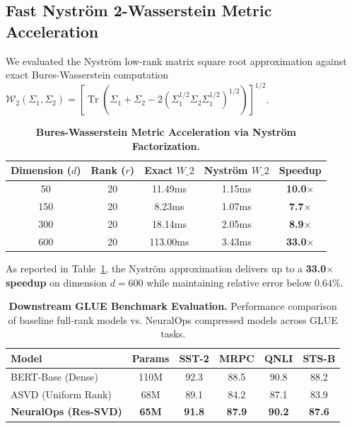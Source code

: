 \subsection{Fast Nystr\"om 2-Wasserstein Metric Acceleration}
We evaluated the Nystr\"om low-rank matrix square root approximation against exact Bures-Wasserstein computation $\mathcal{W}_2(\Sigma_1, \Sigma_2) = \left[\operatorname{Tr}(\Sigma_1 + \Sigma_2 - 2(\Sigma_1^{1/2} \Sigma_2 \Sigma_1^{1/2})^{1/2})\right]^{1/2}$.

\begin{table}[h]
\centering
\small
\caption{\textbf{Bures-Wasserstein Metric Acceleration via Nystr\"om Factorization.}}
\label{tab:nystrom_w2}
\begin{tabularx}{\columnwidth}{ccccc}
\toprule
\textbf{Dimension ($d$)} & \textbf{Rank ($r$)} & \textbf{Exact $W\_2$} & \textbf{Nystr\"om $W\_2$} & \textbf{Speedup} \\
\midrule
50  & 20 & 11.49ms  & 1.15ms & \textbf{10.0$\times$} \\
150 & 20 & 8.23ms   & 1.07ms & \textbf{7.7$\times$} \\
300 & 20 & 18.14ms  & 2.05ms & \textbf{8.9$\times$} \\
600 & 20 & 113.00ms & 3.43ms & \textbf{33.0$\times$} \\
\bottomrule
\end{tabularx}
\end{table}

As reported in Table~\ref{tab:nystrom_w2}, the Nystr\"om approximation delivers up to a \textbf{33.0$\times$ speedup} on dimension $d=600$ while maintaining relative error below $0.64\%$.

\begin{table}[t]
\centering
\small
\caption{\textbf{Downstream GLUE Benchmark Evaluation.} Performance comparison of baseline full-rank models vs. NeuralOps compressed models across GLUE tasks.}
\label{tab:glue_results}
\begin{tabularx}{\columnwidth}{lccccc}
\toprule
\textbf{Model} & \textbf{Params} & \textbf{SST-2} & \textbf{MRPC} & \textbf{QNLI} & \textbf{STS-B} \\
\midrule
BERT-Base (Dense)        & 110M & 92.3 & 88.5 & 90.8 & 88.2 \\
ASVD (Uniform Rank)      & 68M  & 89.1 & 84.2 & 87.1 & 83.9 \\
\textbf{NeuralOps (Res-SVD)} & \textbf{65M} & \textbf{91.8} & \textbf{87.9} & \textbf{90.2} & \textbf{87.6} \\
\bottomrule
\end{tabularx}
\end{table}


